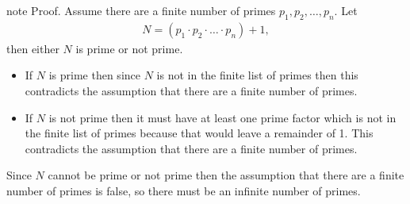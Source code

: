 \documentclass[letterpaper,10pt,english]{jupyterBook}
\begin{document}
\begin{sphinxadmonition}{note}
\sphinxAtStartPar
Proof. Assume there are a finite number of primes \(p_1, p_2, \ldots, p_n\). Let
\begin{equation*}
\begin{split}N = (p_1 \cdot p_2 \cdot \ldots \cdot p_n) + 1, \end{split}
\end{equation*}
\sphinxAtStartPar
then either \(N\) is prime or not prime.
\begin{itemize}
\item {} 
\sphinxAtStartPar
If \(N\) is prime then since \(N\) is not in the finite list of primes then this contradicts the assumption that there are a finite number of primes.

\item {} 
\sphinxAtStartPar
If \(N\) is not prime then it must have at least one prime factor which is not in the finite list of primes because that would leave a remainder of 1. This contradicts the assumption that there are a finite number of primes.

\end{itemize}

\sphinxAtStartPar
Since \(N\) cannot be prime or not prime then the assumption that there are a finite number of primes is false, so there must be an infinite number of primes.
\end{sphinxadmonition}
\end{document}
